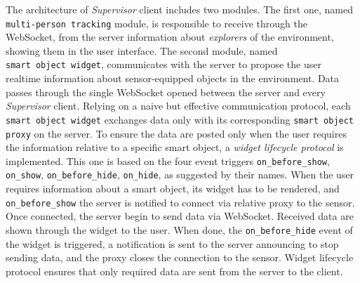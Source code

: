 The architecture of \emph{Supervisor} client includes two modules. The first
one, named \texttt{multi-person\ tracking} module, is responsible to
receive through the WebSocket, from the server information about
\emph{explorers} of the environment, showing them in the user interface. The
second module, named \texttt{smart\ object\ widget}, communicates with the
server to propose the user realtime information about sensor-equip\-ped
objects in the environment. Data passes through the single WebSocket
opened between the server and every \emph{Supervisor} client. Relying on a
naive but effective communication protocol, each \texttt{smart object widget}
exchanges data only with its corresponding \texttt{smart object proxy} on the server. To
ensure the data are posted only when the user requires the information
relative to a specific smart object, a \emph{widget lifecycle protocol} is
implemented. This one is based on the four event triggers \texttt{on\_before\_show},
\texttt{on\_show}, \texttt{on\_before\_hide}, \texttt{on\_hide}, as suggested by their names.
When the user requires information about a smart object, its widget has
to be rendered, and \texttt{on\_before\_show} the server is notified to
connect via relative proxy to the sensor. Once connected, the server
begin to send data via WebSocket. Received data are shown through the
widget to the user. When done, the \texttt{on\_before\_hide} event of the
widget is triggered, a notification is sent to the server announcing to stop sending
data, and the proxy closes the connection to the sensor. Widget lifecycle
protocol ensures that only required data are sent from the server to the
client.

